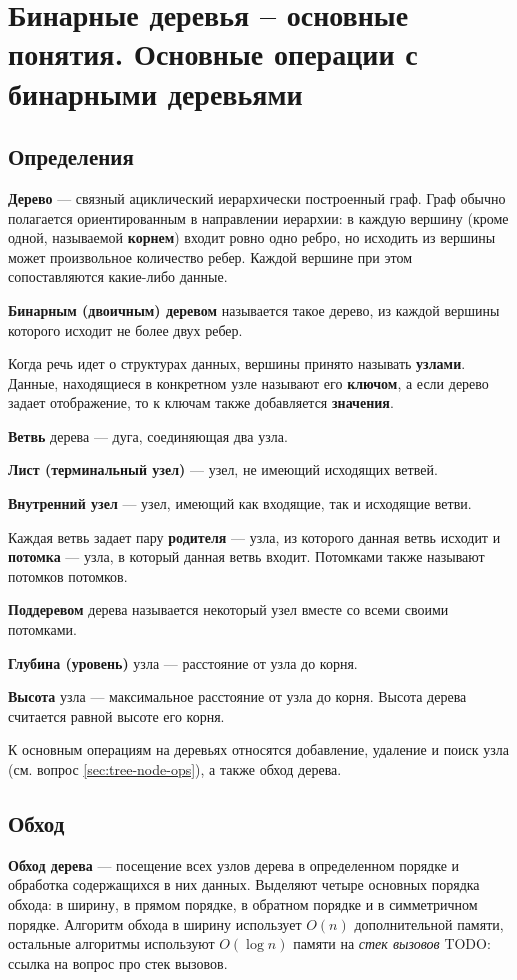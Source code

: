 \section{Бинарные деревья – основные понятия. Основные операции с бинарными деревьями}
\subsection{Определения}
\textbf{Дерево} --- связный ациклический иерархически построенный граф. Граф обычно
полагается ориентированным в направлении иерархии: в каждую вершину (кроме одной,
называемой \textbf{корнем}) входит ровно одно ребро, но исходить из вершины может
произвольное количество ребер. Каждой вершине при этом сопоставляются какие-либо данные.

\textbf{Бинарным (двоичным) деревом} называется такое дерево, из каждой вершины которого
исходит не более двух ребер.

Когда речь идет о структурах данных, вершины принято называть \textbf{узлами}.
Данные, находящиеся в конкретном узле называют его \textbf{ключом}, а если дерево задает
отображение, то к ключам также добавляется \textbf{значения}.

\textbf{Ветвь} дерева --- дуга, соединяющая два узла. 

\textbf{Лист (терминальный узел)} --- узел, не имеющий исходящих ветвей.

\textbf{Внутренний узел} --- узел, имеющий как входящие, так и исходящие ветви.

Каждая ветвь задает пару \textbf{родителя} --- узла, из которого данная ветвь исходит
и \textbf{потомка} --- узла, в который данная ветвь входит. Потомками также называют
потомков потомков.

\textbf{Поддеревом} дерева называется некоторый узел вместе со всеми своими потомками.

\textbf{Глубина (уровень)} узла --- расстояние от узла до корня.

\textbf{Высота} узла --- максимальное расстояние от узла до корня. Высота дерева считается
равной высоте его корня.

К основным операциям на деревьях относятся добавление, удаление и поиск узла (см. вопрос \ref{sec:tree-node-ops}), а также обход дерева.

\subsection{Обход}
\textbf{Обход дерева} --- посещение всех узлов дерева в определенном порядке и обработка содержащихся в них данных.
Выделяют четыре основных порядка обхода: в ширину, в прямом порядке, в обратном порядке и в симметричном порядке.
Алгоритм обхода в ширину использует $O(n)$ дополнительной памяти, остальные алгоритмы используют $O(\log n)$ памяти
на \textit{стек вызовов} {\color{red} TODO: ссылка на вопрос про стек вызовов}.

